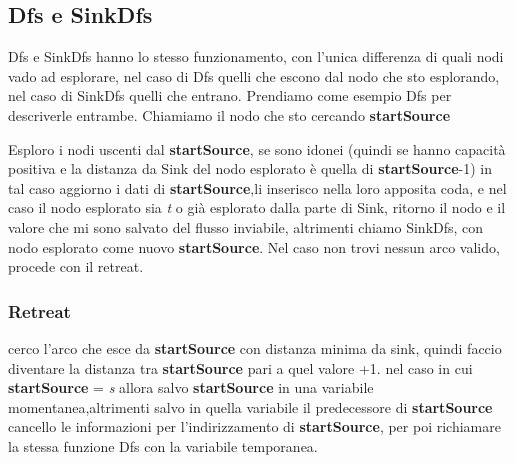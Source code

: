 \documentclass{article}
\begin{document}
\subsection{Dfs e SinkDfs}

Dfs e SinkDfs hanno lo stesso funzionamento, con l'unica differenza di quali nodi vado ad esplorare, nel caso di Dfs quelli che escono dal nodo che sto esplorando, nel caso di SinkDfs quelli che entrano.
Prendiamo come esempio Dfs per descriverle entrambe.
Chiamiamo il nodo che sto cercando \textbf{startSource}

Esploro i nodi uscenti dal \textbf{startSource}, se sono idonei (quindi se hanno capacità positiva e la distanza da Sink del nodo esplorato è quella di \textbf{startSource}-1)
in tal caso aggiorno i dati di \textbf{startSource},li inserisco nella loro apposita coda, e nel caso il nodo esplorato  sia \textit{t} o già esplorato dalla parte di Sink, ritorno il nodo e il valore che mi sono salvato del flusso inviabile, altrimenti chiamo SinkDfs, con nodo esplorato come nuovo \textbf{startSource}.
Nel caso non trovi nessun arco valido, procede con il retreat.

\subsubsection{Retreat}

cerco l'arco che esce da \textbf{startSource} con distanza minima da sink, quindi faccio diventare la distanza tra \textbf{startSource} pari a quel valore +1.
nel caso in cui \textbf{startSource} = \textit{s} allora salvo \textbf{startSource} in una variabile momentanea,altrimenti salvo in quella variabile il predecessore di \textbf{startSource}
cancello le informazioni per l'indirizzamento di \textbf{startSource}, per poi richiamare la stessa funzione Dfs con la variabile temporanea.
\end{document}
